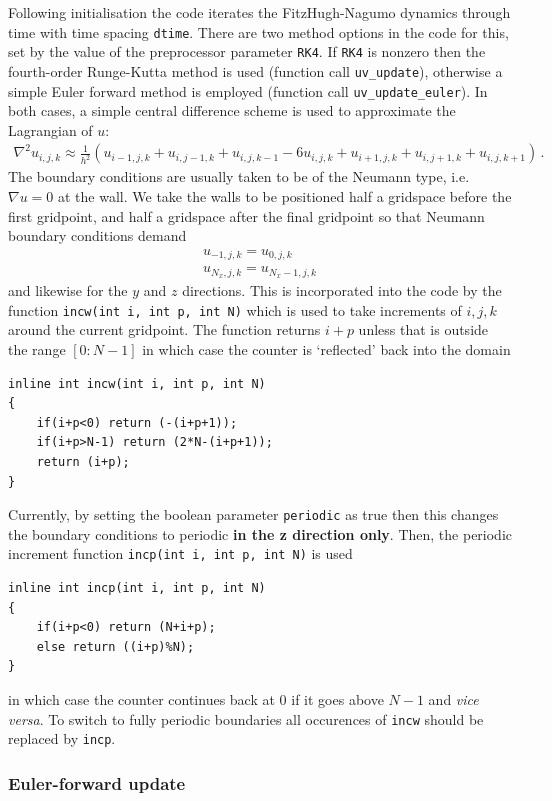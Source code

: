 \documentclass[notitlepage,aps,amsmath,amssymb,11pt]{revtex4-1}
\begin{document}
Following initialisation the code iterates the FitzHugh-Nagumo dynamics through time with time spacing \verb'dtime'. There are two method options in the code for this, set by the value of the preprocessor parameter \verb'RK4'. If \verb'RK4' is nonzero then the fourth-order Runge-Kutta method is used (function call \verb'uv_update'), otherwise a simple Euler forward method is employed (function call \verb'uv_update_euler'). In both cases, a simple central difference scheme is used to approximate the Lagrangian of $u$:
\begin{align}
\nabla^2 u_{i,j,k} \approx \frac{1}{h^2} ( u_{i-1,j,k} + u_{i,j-1,k} + u_{i,j,k-1} - 6 u_{i,j,k} + u_{i+1,j,k} +  u_{i,j+1,k}  +  u_{i,j,k+1} ) \, . 
\end{align}
The boundary conditions are usually taken to be of the Neumann type, i.e. $\nabla u = 0$ at the wall. We take the walls to be positioned half a gridspace before the first gridpoint, and half a gridspace after the final gridpoint so that Neumann boundary conditions demand
\begin{align}
u_{-1, j, k} = u_{0,j,k}\\
u_{N_x, j, k} = u_{N_x-1,j,k}
\end{align}
and likewise for the $y$ and $z$ directions. This is incorporated into the code by the function \verb'incw(int i, int p, int N)' which is used to take increments of $i,j,k$ around the current gridpoint. The function returns $i+p$ unless that is outside the range $[0:N-1]$ in which case the counter is `reflected' back into the domain
\begin{verbatim}
inline int incw(int i, int p, int N)   
{
    if(i+p<0) return (-(i+p+1));
    if(i+p>N-1) return (2*N-(i+p+1));
    return (i+p);
}
\end{verbatim} 
Currently, by setting the boolean parameter \verb'periodic' as true then this changes the boundary conditions to periodic {\bf in the z direction only}. Then, the periodic increment function \verb'incp(int i, int p, int N)' is used
\begin{verbatim}
inline int incp(int i, int p, int N)   
{
    if(i+p<0) return (N+i+p);
    else return ((i+p)%N);
}
\end{verbatim} 
in which case the counter continues back at $0$ if it goes above $N-1$ and \emph{vice versa}. To switch to fully periodic boundaries all occurences of \verb'incw' should be replaced by \verb'incp'.

\subsubsection{Euler-forward update}
\end{document}
